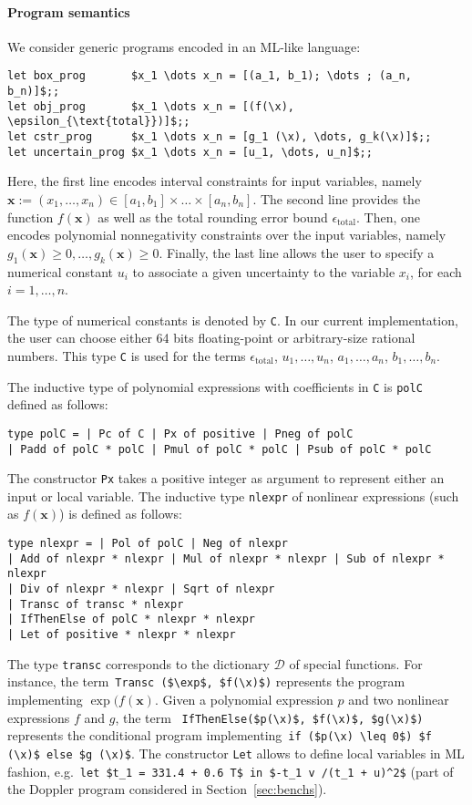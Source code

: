 \documentclass[a4paper,10pt]{article}
\newcommand{\code}[1]{\lstinline{#1}}
\newcommand{\setD}{\mathcal{D}} %
\newcommand{\x}{\mathbf{x}}
\theoremstyle{plain}
\theoremstyle{definition}
\theoremstyle{remark}
\begin{document}
\paragraph{Program semantics}
%
We consider generic programs encoded in an ML-like language:
\begin{lstlisting}
let box_prog       $x_1 \dots x_n = [(a_1, b_1); \dots ; (a_n, b_n)]$;;
let obj_prog       $x_1 \dots x_n = [(f(\x), \epsilon_{\text{total}})]$;;
let cstr_prog      $x_1 \dots x_n = [g_1 (\x), \dots, g_k(\x)]$;;
let uncertain_prog $x_1 \dots x_n = [u_1, \dots, u_n]$;;
\end{lstlisting}
Here, the first line encodes interval constraints for input variables, namely $\x := (x_1, \dots, x_n) \in [a_1, b_1]\times \dots \times [a_n, b_n]$.
The second line provides the function $f(\x)$ as well as the total rounding error bound $\epsilon_{\text{total}}$.
Then, one encodes polynomial nonnegativity constraints over the input variables, namely $g_1(\x) \geq 0, \dots, g_k(\x) \geq 0$. Finally, the last line allows the user to specify a numerical constant $u_i$ to associate a given uncertainty to the variable $x_i$, for each $i= 1, \dots, n$.

The type of numerical constants is denoted by \code{C}. In our current implementation, the user can choose either 64 bits floating-point or arbitrary-size rational numbers. This type \code{C} is used for the terms $\epsilon_{\text{total}}$, $u_1, \dots, u_n$, $a_1, \dots, a_n$, $b_1, \dots, b_n$.

The inductive type of polynomial expressions with coefficients in \code{C} is \code{polC} defined as follows:
\begin{lstlisting}
type polC = | Pc of C | Px of positive | Pneg of polC
| Padd of polC * polC | Pmul of polC * polC | Psub of polC * polC
\end{lstlisting}
%
The constructor \code{Px} takes a positive integer as argument to represent either an input or local variable.
The inductive type \code{nlexpr} of nonlinear expressions (such as $f(\x)$) is defined as follows:
\begin{lstlisting}
type nlexpr = | Pol of polC | Neg of nlexpr
| Add of nlexpr * nlexpr | Mul of nlexpr * nlexpr | Sub of nlexpr * nlexpr 
| Div of nlexpr * nlexpr | Sqrt of nlexpr 
| Transc of transc * nlexpr
| IfThenElse of polC * nlexpr * nlexpr
| Let of positive * nlexpr * nlexpr
\end{lstlisting}
%
The type \code{transc} corresponds to the dictionary $\setD$ of special functions. For instance, the term~\lstinline|Transc ($\exp$, $f(\x)$)| represents the program implementing $\exp(f(\x)$.
Given a polynomial expression $p$ and two nonlinear expressions $f$ and $g$, the term ~\lstinline|IfThenElse($p(\x)$, $f(\x)$, $g(\x)$)| represents the conditional program implementing~\lstinline|if ($p(\x) \leq 0$) $f (\x)$ else $g (\x)$|. The constructor \code{Let} allows to define local variables in ML fashion, e.g.~\lstinline|let $t_1 = 331.4 + 0.6 T$ in $-t_1 v /(t_1 + u)^2$| (part of the Doppler program considered in Section~\ref{sec:benchs}).
%
%
\end{document}
